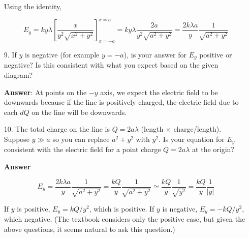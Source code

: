 \documentclass{article}
\begin{document}
\begin{enumerate}
            Using the identity,

            \begin{equation}
            E_y = ky\lambda \left[\frac{x}{y^2\sqrt{x^2+y^2}}\right]_{x=-a}^{x=a}=ky\lambda \frac{2a}{y^2\sqrt{a^2+y^2}}=\frac{2k\lambda a}{y}\frac{1}{\sqrt{a^2+y^2}}
            \end{equation}
            \else

            \newpage
            \fi
            \ifsolutions\else
            \newpage
            \fi

  \item[9.] If $y$ is negative (for example $y=-a$), is your answer for $E_y$ positive or negative? Is this consistent with what you expect based on the given diagram?

            \ifsolutions
            \textbf{Answer}: At points on the $-y$ axis, we expect the electric field to be downwards because if the line is positively charged, the electric field due to each $dQ$ on the line will be downwards.
            \else

            \vskip 36pt
            \fi
            \ifsolutions\else
            \vskip 36pt
            \fi

  \item[10.] The total charge on the line is $Q=2a\lambda$ (length $\times$ charge/length). Suppose $y\gg a$ so you can replace $a^2+y^2$ with $y^2$. Is your equation for $E_y$ consistent with the electric field for a point charge $Q=2a\lambda$ at the origin?

             \ifsolutions
             \textbf{Answer}

             \begin{equation}
             E_y = \frac{2k\lambda a}{y}\frac{1}{\sqrt{a^2+y^2}} =  \frac{kQ}{y}\frac{1}{\sqrt{a^2+y^2}} \simeq  \frac{kQ}{y}\frac{1}{\sqrt{y^2}}=\frac{kQ}{y}\frac{1}{|y|}
             \end{equation}

             If $y$ is positive, $E_y=kQ/y^2$, which is positive. If $y$ is negative, $E_y=-kQ/y^2$, which negative. (The textbook considers only the positive case, but given the above questions, it seems natural to ask this question.)
             \else

             \vskip 72pt
             \fi
             \ifsolutions\else
             \vskip 72pt
             \fi

\end{enumerate}
\end{document}
